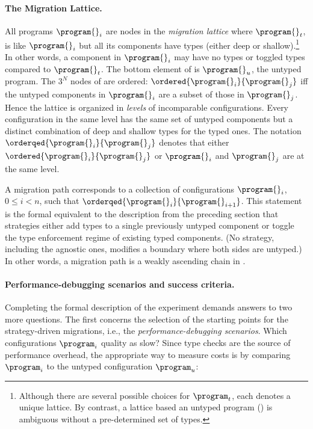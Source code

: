 \paragraph{The Migration Lattice.}  All programs $\program{}_i$ are nodes in the
\emph{migration lattice}  where ${\program{}_t}$, is like
${\program{}_i}$ but all its components have types (either deep or
shallow).\footnote{Although there are several possible choices for
$\program_t$, each denotes a unique lattice. By contrast, a lattice
based an untyped program () is ambiguous without a
pre-determined set of types.}
In other words, a component in ${\program{}_i}$ may have no types 
or toggled types compared to ${\program{}_t}$.
The bottom element of  is ${\program{}_u}$, the untyped
program.
The $3^N$ nodes of  are ordered:
$\ordered{\program{}_i}{\program{}_j}$ iff
the untyped components in ${\program{}_i}$ are a subset
of those in ${\program{}_j}$.
Hence the lattice is organized in \emph{levels} of incomparable
configurations.
Every configuration in the same level has the same set of untyped components
but a distinct combination of deep and shallow types for the typed ones.
The notation $\orderqed{\program{}_i}{\program{}_j}$ denotes that either
$\ordered{\program{}_i}{\program{}_j}$ or $\program{}_i$ and $\program{}_j$
are at the same level.

A migration path corresponds to a collection of configurations $\program{}_i$,
$0 \leq i < n$, such that $\orderqed{\program{}_i}{\program{}_{i+1}}$.
This statement is the formal equivalent to the
description from the preceding section that strategies either add types to a
single previously untyped component or toggle the type enforcement regime of existing
typed components.
(No strategy, including the agnostic ones, modifies a boundary where both sides
are untyped.)
In other words, a migration path is a weakly ascending chain in
.


\paragraph{Performance-debugging scenarios and success criteria.} Completing the
formal description of the experiment demands answers to two more questions.
The first concerns the selection of the starting points for the strategy-driven
migrations, i.e., the \emph{performance-debugging scenarios}.
Which configurations $\program_i$ quality as slow?
Since type checks are the source of performance overhead, the appropriate
way to measure costs is by comparing $\program_i$ to the untyped configuration
$\program_u$:

